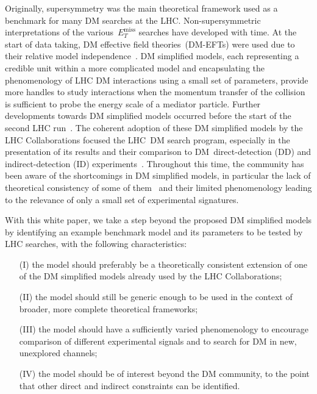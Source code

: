 \documentclass[review]{elsarticle}
\newcommand{\MET}{\ensuremath{E_T^\mathrm{miss}}\xspace}
\begin{document}
Originally, supersymmetry was the main theoretical framework used as a benchmark for many DM searches at the LHC.  Non-supersymmetric interpretations of the various~$\MET$ searches have  developed with time. At the start of data taking, DM effective field theories~(DM-EFTs)  were used due to their relative model independence~\cite{Cao:2009uw,Beltran:2010ww,Goodman:2010yf,Bai:2010hh,Goodman:2010ku,Fox:2011pm}.  DM simplified models, each representing a credible unit within a more complicated model and encapsulating the phenomenology of LHC DM interactions using a small set of parameters, provide more handles to study interactions when the momentum transfer of the collision is sufficient to probe the energy scale of a mediator particle. Further developments towards DM simplified models occurred before the start of the second LHC run~\cite{Abdallah:2015ter,Abercrombie:2015wmb}.  The coherent adoption of these DM simplified models by the LHC Collaborations focused the LHC~DM search program, especially in the presentation of its results and their comparison to DM~direct-detection (DD) and indirect-detection (ID) experiments~\cite{Boveia:2016mrp,Albert:2017onk}.  Throughout this time, the community has been aware of the shortcomings in DM simplified models, in particular the lack of theoretical consistency of some of them~\cite{Chala:2015ama,Bell:2015sza,Kahlhoefer:2015bea,Bell:2015rdw,Haisch:2016usn,Englert:2016joy,Ko:2016zxg} and their limited phenomenology leading to the relevance of only a small set of experimental signatures.  

With this white paper, we take a step beyond the proposed DM simplified models by identifying an example benchmark model and its parameters to be tested by LHC searches, with the following characteristics: 
\begin{itemize}
\item[(I)] the model should preferably be a theoretically consistent extension of one of the DM simplified models already used by the LHC Collaborations;
\item[(II)] the model should still be generic enough to be used in the context of broader, more complete theoretical frameworks;  
\item[(III)] the model should have a sufficiently varied phenomenology to encourage comparison of different experimental signals and to search for DM in new, unexplored channels;
\item[(IV)] the model should be of interest beyond the DM community, to the point that other direct and indirect constraints can be identified.
\end{itemize}
\end{document}
